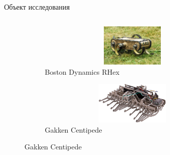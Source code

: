 \documentclass[aspectratio=169,xcolor=table,10pt]{beamer}
\begin{document}
\begin{frame}[t]{Объект исследования}
\begin{columns}[T,onlytextwidth]
\begin{column}{0.44\textwidth}
\begin{figure}[H]
                \hfill
                \begin{subfigure}{0.49\textwidth}
                    \centering\includegraphics[height=2cm,width=1\textwidth,keepaspectratio]{from_master/rhex.jpg}
                    \caption{Boston Dynamics RHex}
                    \label{fig:from_master/rhex.jpg}
                \end{subfigure}
                \begin{subfigure}{0.49\textwidth}
                    \centering\includegraphics[height=2cm,width=1\textwidth,keepaspectratio]{from_master/gakken.jpg}
                    \caption{Gakken Centipede}
                    \label{fig:from_master/gakken.jpg}
                \end{subfigure}
            \end{figure}
        \end{column}
    \end{columns}
\end{frame}
\end{document}
